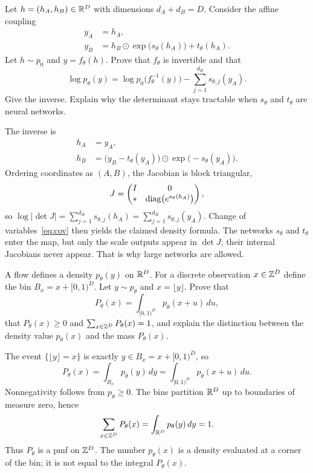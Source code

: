 \begin{hwqbox}
Let $h=(h_A,h_B)\in\mathbb{R}^D$ with dimensions $d_A+d_B=D$. Consider the affine coupling
\begin{align*}
y_A&=h_A,\\
y_B&=h_B\odot\exp\bigl(s_\theta(h_A)\bigr)+t_\theta(h_A).
\end{align*}
Let $h\sim p_0$ and $y=f_\theta(h)$. Prove that $f_\theta$ is invertible and that
\[
\log p_\theta(y)
=\log p_0\bigl(f_\theta^{-1}(y)\bigr)
-\sum_{j=1}^{d_B}s_{\theta,j}(y_A).
\]
Give the inverse. Explain why the determinant stays tractable when $s_\theta$ and $t_\theta$ are neural networks.
\end{hwqbox}
\begin{hwsolbox}
The inverse is
\begin{align*}
h_A&=y_A,\\
h_B&=\bigl(y_B-t_\theta(y_A)\bigr)\odot\exp\bigl(-s_\theta(y_A)\bigr).
\end{align*}
Ordering coordinates as $(A,B)$, the Jacobian is block triangular,
\[
J=\begin{pmatrix}I&0\\ \ast&\operatorname{diag}\bigl(e^{s_\theta(h_A)}\bigr)\end{pmatrix},
\]
so $\log\lvert\det J\rvert=\sum_{j=1}^{d_B}s_{\theta,j}(h_A)=\sum_{j=1}^{d_B}s_{\theta,j}(y_A)$. Change of variables~\eqref{eq:cov} then yields the claimed density formula. The networks $s_\theta$ and $t_\theta$ enter the map, but only the scale outputs appear in $\det J$; their internal Jacobians never appear. That is why large networks are allowed.
\end{hwsolbox}

\begin{hwqbox}
A flow defines a density $p_\theta(y)$ on $\mathbb{R}^D$. For a discrete observation $x\in\mathbb{Z}^D$ define the bin $B_x=x+[0,1)^D$. Let $y\sim p_\theta$ and $x=\lfloor y\rfloor$. Prove that
\[
P_\theta(x)=\int_{[0,1)^D}p_\theta(x+u)\,du,
\]
that $P_\theta(x)\ge 0$ and $\sum_{x\in\mathbb{Z}^D}P_\theta(x)=1$, and explain the distinction between the density value $p_\theta(x)$ and the mass $P_\theta(x)$.
\end{hwqbox}
\begin{hwsolbox}
The event $\{\lfloor y\rfloor=x\}$ is exactly $y\in B_x=x+[0,1)^D$, so
\[
P_\theta(x)=\int_{B_x}p_\theta(y)\,dy=\int_{[0,1)^D}p_\theta(x+u)\,du.
\]
Nonnegativity follows from $p_\theta\ge 0$. The bins partition $\mathbb{R}^D$ up to boundaries of measure zero, hence
\[
\sum_{x\in\mathbb{Z}^D}P_\theta(x)=\int_{\mathbb{R}^D}p_\theta(y)\,dy=1.
\]
Thus $P_\theta$ is a pmf on $\mathbb{Z}^D$. The number $p_\theta(x)$ is a density evaluated at a corner of the bin; it is not equal to the integral $P_\theta(x)$.
\end{hwsolbox}

